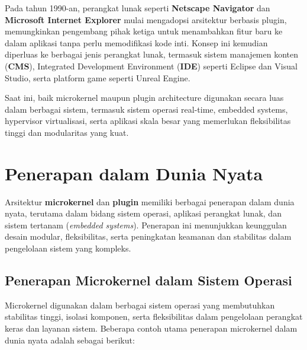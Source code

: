 Pada tahun 1990-an, perangkat lunak seperti \textbf{Netscape Navigator} dan \textbf{Microsoft Internet Explorer} mulai mengadopsi arsitektur berbasis plugin, memungkinkan pengembang pihak ketiga untuk menambahkan fitur baru ke dalam aplikasi tanpa perlu memodifikasi kode inti. Konsep ini kemudian diperluas ke berbagai jenis perangkat lunak, termasuk sistem manajemen konten (\textbf{CMS}), Integrated Development Environment (\textbf{IDE}) seperti Eclipse dan Visual Studio, serta platform game seperti Unreal Engine.

Saat ini, baik microkernel maupun plugin architecture digunakan secara luas dalam berbagai sistem, termasuk sistem operasi real-time, embedded systems, hypervisor virtualisasi, serta aplikasi skala besar yang memerlukan fleksibilitas tinggi dan modularitas yang kuat.


\section{Penerapan dalam Dunia Nyata}

Arsitektur \textbf{microkernel} dan \textbf{plugin} memiliki berbagai penerapan dalam dunia nyata, terutama dalam bidang sistem operasi, aplikasi perangkat lunak, dan sistem tertanam (\textit{embedded systems}). Penerapan ini menunjukkan keunggulan desain modular, fleksibilitas, serta peningkatan keamanan dan stabilitas dalam pengelolaan sistem yang kompleks.

\subsection{Penerapan Microkernel dalam Sistem Operasi}

Microkernel digunakan dalam berbagai sistem operasi yang membutuhkan stabilitas tinggi, isolasi komponen, serta fleksibilitas dalam pengelolaan perangkat keras dan layanan sistem. Beberapa contoh utama penerapan microkernel dalam dunia nyata adalah sebagai berikut:

